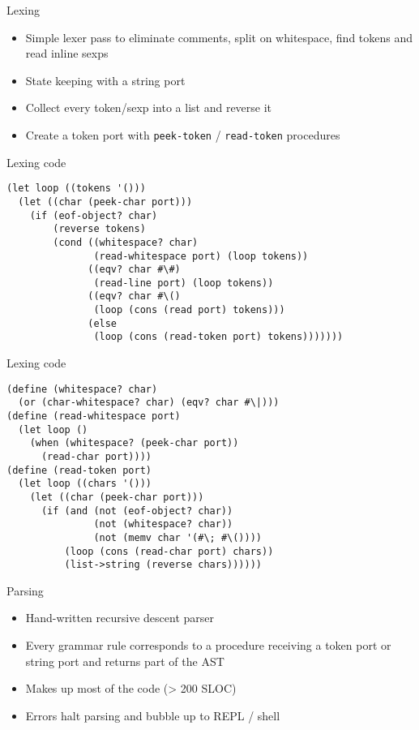 \documentclass[presentation]{beamer}
\begin{document}
\begin{frame}[fragile,label=sec-3-8]{Lexing}
 \begin{itemize}
\item Simple lexer pass to eliminate comments, split on whitespace, find
tokens and read inline sexps
\item State keeping with a string port
\item Collect every token/sexp into a list and reverse it
\item Create a token port with \texttt{peek-token} / \texttt{read-token} procedures
\end{itemize}
\end{frame}

\begin{frame}[fragile,label=sec-3-9]{Lexing code}
 \begin{verbatim}
(let loop ((tokens '()))
  (let ((char (peek-char port)))
    (if (eof-object? char)
        (reverse tokens)
        (cond ((whitespace? char)
               (read-whitespace port) (loop tokens))
              ((eqv? char #\#)
               (read-line port) (loop tokens))
              ((eqv? char #\()
               (loop (cons (read port) tokens)))
              (else
               (loop (cons (read-token port) tokens)))))))
\end{verbatim}
\end{frame}

\begin{frame}[fragile,label=sec-3-10]{Lexing code}
 \begin{verbatim}
(define (whitespace? char)
  (or (char-whitespace? char) (eqv? char #\|)))
(define (read-whitespace port)
  (let loop ()
    (when (whitespace? (peek-char port))
      (read-char port))))
(define (read-token port)
  (let loop ((chars '()))
    (let ((char (peek-char port)))
      (if (and (not (eof-object? char))
               (not (whitespace? char))
               (not (memv char '(#\; #\())))
          (loop (cons (read-char port) chars))
          (list->string (reverse chars))))))
\end{verbatim}
\end{frame}

\begin{frame}[label=sec-3-11]{Parsing}
\begin{itemize}
\item Hand-written recursive descent parser
\item Every grammar rule corresponds to a procedure receiving a token port
or string port and returns part of the AST
\item Makes up most of the code (> 200 SLOC)
\item Errors halt parsing and bubble up to REPL / shell
\end{itemize}
\end{frame}
\end{document}
